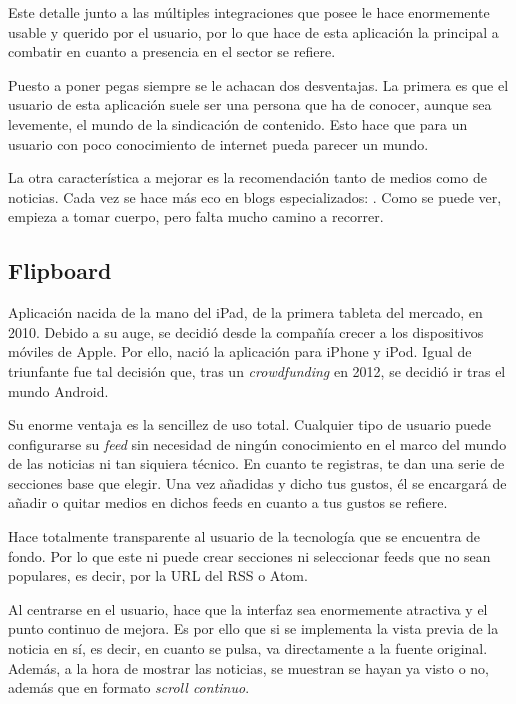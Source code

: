 Este detalle junto a las múltiples integraciones que posee le hace enormemente usable y querido por el usuario, por lo que hace de esta aplicación la principal a combatir en cuanto a presencia en el sector se refiere.

Puesto a poner pegas siempre se le achacan dos desventajas. La primera es que el usuario de esta aplicación suele ser una persona que ha de conocer, aunque sea levemente, el mundo de la sindicación de contenido. Esto hace que para un usuario con poco conocimiento de internet pueda parecer un mundo.


La otra característica a mejorar es la recomendación tanto de medios como de noticias. Cada vez se hace más eco en blogs especializados: . Como se puede ver, empieza a tomar cuerpo, pero falta mucho camino a recorrer.

\subsection{Flipboard}

Aplicación nacida de la mano del iPad, de la primera tableta del mercado, en 2010. Debido a su auge, se decidió desde la compañía crecer a los dispositivos móviles de Apple. Por ello, nació la aplicación para iPhone y iPod. Igual de triunfante fue tal decisión que, tras un \textit{crowdfunding} en 2012, se decidió ir tras el mundo Android.


Su enorme ventaja es la sencillez de uso total. Cualquier tipo de usuario puede configurarse su \textit{feed} sin necesidad de ningún conocimiento en el marco del mundo de las noticias ni tan siquiera técnico. En cuanto te registras, te dan una serie de secciones base que elegir. Una vez añadidas y dicho tus gustos, él se encargará de añadir o quitar medios en dichos feeds en cuanto a tus gustos se refiere.

Hace totalmente transparente al usuario de la tecnología que se encuentra de fondo. Por lo que este ni puede crear secciones ni seleccionar feeds que no sean populares, es decir, por la URL del RSS o Atom.

Al centrarse en el usuario, hace que la interfaz sea enormemente atractiva y el punto continuo de mejora. Es por ello que si se implementa la vista previa de la noticia en sí, es decir, en cuanto se pulsa, va directamente a la fuente original. Además, a la hora de mostrar las noticias, se muestran se hayan ya visto o no, además que en formato \textit{scroll continuo}.

